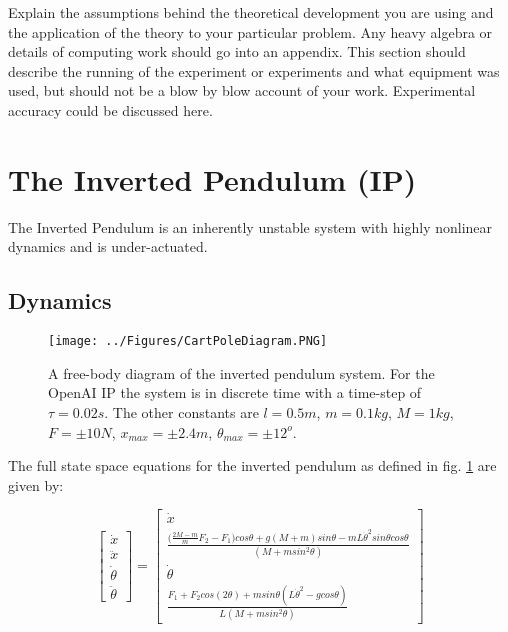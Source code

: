 \documentclass[main.tex]{subfiles}
\begin{document}
Explain the assumptions behind the theoretical development you are using and the application of the theory to your particular problem. Any heavy algebra or details of computing work should go into an appendix.
This section should describe the running of the experiment or experiments and what equipment was used, but should not be a blow by blow account of your work. Experimental accuracy could be discussed here.

\section{The Inverted Pendulum (IP)}
The Inverted Pendulum is an inherently unstable system with highly nonlinear dynamics and is under-actuated.

\subsection{Dynamics}

\begin{figure}[ht]
    \centering
    \texttt{[image: ../Figures/CartPoleDiagram.PNG]}
    \caption{A free-body diagram of the inverted pendulum system. For the OpenAI IP the system is in discrete time with a time-step of $\tau = 0.02s$. The other constants are $l = 0.5m$, $m=0.1kg$, $M=1kg$, $F=\pm10N$, $x_{max}=\pm 2.4m$, $\theta_{max} = \pm 12^o$.}
    \label{fig:invpen}
\end{figure}

The full state space equations for the inverted pendulum as defined in fig. \ref{fig:invpen} are given by:

\begin{equation}
\begin{bmatrix} \dot{x} \\ \ddot{x} \\ \dot{\theta} \\ \ddot{\theta} \end{bmatrix}  =
\begin{bmatrix} \dot{x} \\ \frac{\big(\frac{2M-m}{m}F_2-F_1\big)cos\theta + g(M+m)sin\theta - mL\dot{\theta}^2 sin\theta cos\theta}{(M + m sin^2\theta)} \\ \dot{\theta} \\ \frac{F_1 + F_2cos(2\theta)+ msin\theta(L\dot{\theta}^2-g cos\theta)}{L(M+m sin^2\theta)} \end{bmatrix} 
\end{equation}
\end{document}
